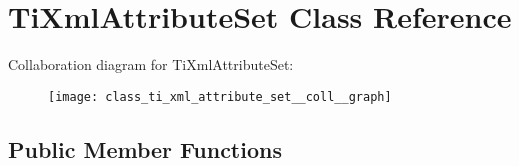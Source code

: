 \hypertarget{class_ti_xml_attribute_set}{\section{\-Ti\-Xml\-Attribute\-Set \-Class \-Reference}
\label{class_ti_xml_attribute_set}
}


\-Collaboration diagram for \-Ti\-Xml\-Attribute\-Set\-:\nopagebreak
\begin{figure}[H]
\begin{center}
\leavevmode
\texttt{[image: class\_ti\_xml\_attribute\_set\_\_coll\_\_graph]}
\end{center}
\end{figure}
\subsection*{\-Public \-Member \-Functions}
